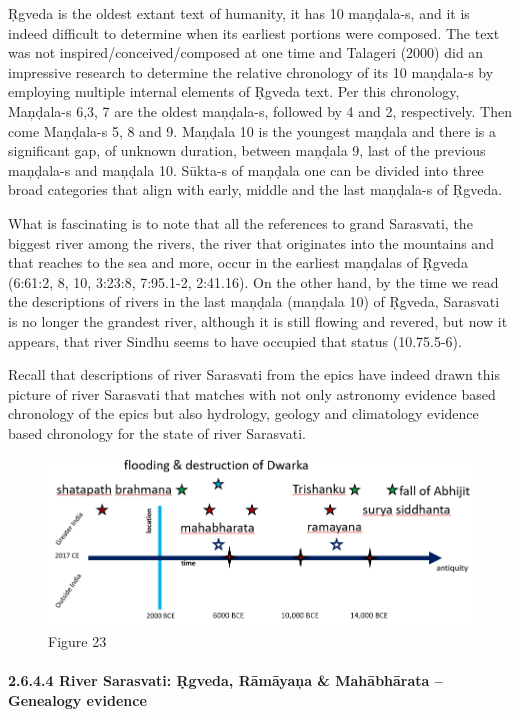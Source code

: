 Ṛgveda is the oldest extant text of humanity, it has 10 maņḍala-s, and it is indeed difficult to determine when its earliest portions were composed. The text was not inspired/conceived/composed at one time and Talageri (2000) did an impressive research to determine the relative chronology of its 10 maņḍala-s by employing multiple internal elements of Ṛgveda text. Per this chronology, Maņḍala-s 6,3, 7 are the oldest maņḍala-s, followed by 4 and 2, respectively. Then come Maņḍala-s 5, 8 and 9. Maņḍala 10 is the youngest maņḍala and there is a significant gap, of unknown duration, between maņḍala 9, last of the previous maņḍala-s and maņḍala 10. Sūkta-s of maņḍala one can be divided into three broad categories that align with early, middle and the last maņḍala-s of Ṛgveda.

What is fascinating is to note that all the references to grand Sarasvati, the biggest river among the rivers, the river that originates into the mountains and that reaches to the sea and more, occur in the earliest maņḍalas of Ṛgveda (6:61:2, 8, 10, 3:23:8, 7:95.1-2, 2:41.16). On the other hand, by the time we read the descriptions of rivers in the last maņḍala (maņḍala 10) of Ṛgveda, Sarasvati is no longer the grandest river, although it is still flowing and revered, but now it appears, that river Sindhu seems to have occupied that status (10.75.5-6).

Recall that descriptions of river Sarasvati from the epics have indeed drawn this picture of river Sarasvati that matches with not only astronomy evidence based chronology of the epics but also hydrology, geology and climatology evidence based chronology for the state of river Sarasvati.

\begin{figure}
\includegraphics{"images/8-23.jpg"}
\caption{Figure 23}
\end{figure}


\paragraph{2.6.4.4 River Sarasvati: Ṛgveda, Rāmāyaņa \& Mahābhārata – Genealogy evidence}

